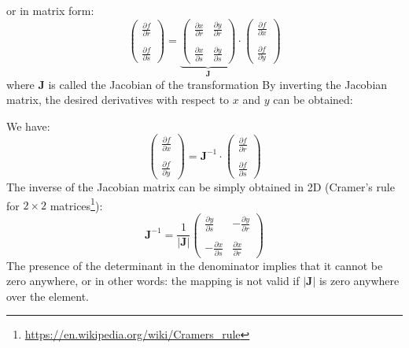 or in matrix form:
\begin{equation}
\left(
\begin{array}{c}
\frac{\partial f}{\partial r} \\ \\
\frac{\partial f}{\partial s}
\end{array}
\right)
=
\underbrace{
\left(
\begin{array}{cc}
\frac{\partial x}{\partial r} & \frac{\partial y}{\partial r} \nonumber\\ \\
\frac{\partial x}{\partial s} & \frac{\partial y}{\partial s} \nonumber
\end{array}
\right)
}_{\bm J}
\cdot
\left(
\begin{array}{c}
\frac{\partial f}{\partial x} \\ \\
\frac{\partial f}{\partial y}
\end{array}
\right)
\end{equation}
where ${\bm J}$ is called the Jacobian of the transformation
By inverting the Jacobian matrix, the desired derivatives with respect to $x$
and $y$ can be obtained:

We have:
\[
\left(
\begin{array}{c}
\frac{\partial f}{\partial x} \\ \\
\frac{\partial f}{\partial y}
\end{array}
\right)
=
{\bm J}^{-1} \cdot 
\left(
\begin{array}{c}
\frac{\partial f}{\partial r} \\ \\
\frac{\partial f}{\partial s}
\end{array}
\right)
\]
The inverse of the Jacobian matrix can be simply obtained in 
2D (Cramer's rule for $2\times2$ matrices\footnote{\url{https://en.wikipedia.org/wiki/Cramers_rule}}):
\[
{\bm J}^{-1} = \frac{1}{|{\bm J}|} 
\left(
\begin{array}{cc}
\frac{\partial y}{\partial s} & -\frac{\partial y}{\partial r} \nonumber\\ \\
-\frac{\partial x}{\partial s} & \frac{\partial x}{\partial r} \nonumber
\end{array}
\right)
\]
The presence of the determinant in the denominator implies that it cannot 
be zero anywhere, or in other words: the mapping is not valid if $|{\bm J}|$
is zero anywhere over the element.

